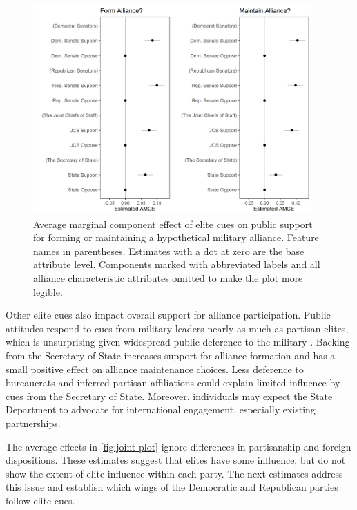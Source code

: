 \documentclass[12pt]{article}
\begin{document}
\begin{figure}[htpb]
	\centering
		\includegraphics[width=0.95\textwidth]{../figures/joint-amce-plots-el.png}
	\caption{Average marginal component effect of elite cues on public support for forming or maintaining a hypothetical military alliance. Feature names in parentheses. Estimates with a dot at zero are the base attribute level. Components marked with abbreviated labels and all alliance characteristic attributes omitted to make the plot more legible.}
	\label{fig:joint-plot}
\end{figure}


Other elite cues also impact overall support for alliance participation. 
Public attitudes respond to cues from military leaders nearly as much as partisan elites, which is unsurprising given widespread public deference to the military \citep{Golbyetal2018}. 
Backing from the Secretary of State increases support for alliance formation and has a small positive effect on alliance maintenance choices. 
Less deference to bureaucrats and inferred partisan affiliations could explain limited influence by cues from the Secretary of State. 
Moreover, individuals may expect the State Department to advocate for international engagement, especially existing partnerships.


The average effects in \autoref{fig:joint-plot} ignore differences in partisanship and foreign dispositions.
These estimates suggest that elites have some influence, but do not show the extent of elite influence within each party. 
The next estimates address this issue and establish which wings of the Democratic and Republican parties follow elite cues. 
\end{document}
